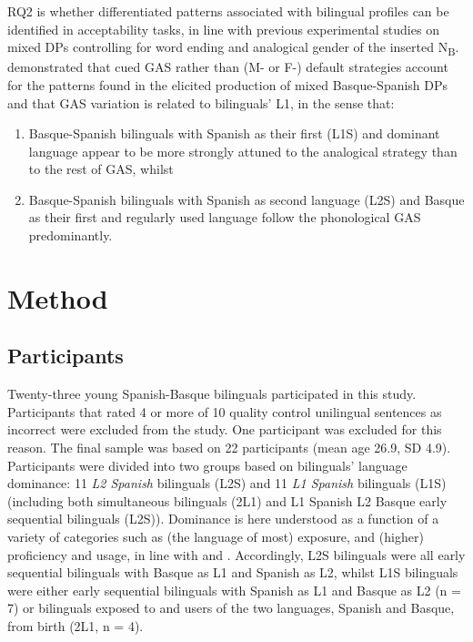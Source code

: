 \documentclass[output=paper]{langscibook}
\begin{document}
RQ2 is whether differentiated patterns associated with bilingual profiles can be identified in acceptability tasks, in line with previous experimental studies on mixed DPs controlling for word ending and analogical gender of the inserted N\textsubscript{B}. \citet{Munarriz-IbarrolaEtAl2022} demonstrated that cued GAS rather than (M- or F-) default strategies account for the patterns found in the elicited production of mixed Basque-Spanish DPs and that GAS variation is related to bilinguals’ L1, in the sense that:

\begin{enumerate}
\item[i.]  Basque-Spanish bilinguals with Spanish as their first (L1S) and dominant language appear to be more strongly attuned to the analogical strategy than to the rest of GAS, whilst
\item[ii.] Basque-Spanish bilinguals with Spanish as second language (L2S) and Basque as their first and regularly used language follow the phonological GAS predominantly.
\end{enumerate}

\section{Method}\label{sec:ezeiza:3}

\subsection{Participants}\label{sec:ezeiza:3.1}

Twenty-three young Spanish-Basque bilinguals participated in this study. Participants that rated 4 or more of 10 quality control unilingual sentences as incorrect were excluded from the study. One participant was excluded for this reason. The final sample was based on 22 participants (mean age 26.9, SD 4.9). Participants were divided into two groups based on bilinguals’ language dominance: 11 \textit{L2 Spanish} bilinguals (L2S) and 11 \textit{L1 Spanish} bilinguals (L1S) (including both  simultaneous bilinguals (2L1) and L1 Spanish L2 Basque early sequential bilinguals (L2S)). Dominance is here understood as a function of a variety of categories such as (the language of most) exposure, and (higher) proficiency and usage, in line with \citet{Meisel2019} and \citet{Montrul2016}. Accordingly, L2S bilinguals were all early sequential bilinguals with Basque as L1 and Spanish as L2, whilst L1S bilinguals were either early sequential bilinguals with Spanish as L1 and Basque as L2 (n = 7) or bilinguals exposed to and users of the two languages, Spanish and Basque, from birth (2L1, n = 4).
\end{document}
